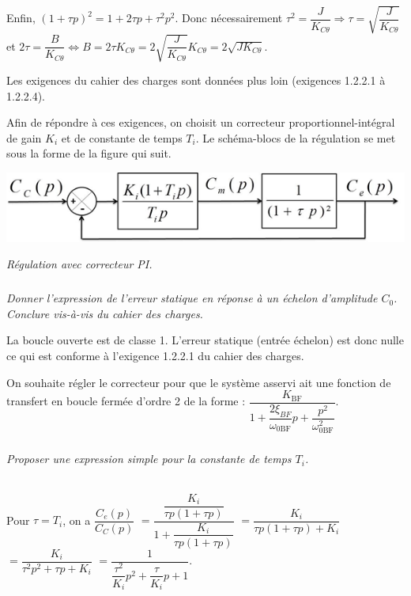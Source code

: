 \documentclass[10pt,fleqn]{article} %
\begin{document}
\begin{multicols}{2}
\begin{corrige}
Enfin, $\left(1+\tau p\right)^2 = 1+2\tau p + \tau^2p^2$. Donc nécessairement $\tau^2=\dfrac{J}{K_{C\theta}} \Rightarrow \tau=\sqrt{\dfrac{J}{K_{C\theta}}}$ et 
$2\tau = \dfrac{B}{K_{C\theta}} \Leftrightarrow B
=2\tau K_{C\theta}
=2\sqrt{\dfrac{J}{K_{C\theta}}} K_{C\theta}
=2\sqrt{JK_{C\theta}}$.
\end{corrige}
\else
\fi


\ifprof
\else
Les exigences du cahier des charges sont données plus loin (exigences 1.2.2.1 à 1.2.2.4).

Afin de répondre à ces exigences, on choisit un correcteur proportionnel-intégral de gain $K_i$ et de constante de temps $T_i$. Le schéma-blocs de la régulation se met sous la forme de la figure qui suit.

\begin{center}
\includegraphics[width=\linewidth]{images/Sujet/images/fig_08}

\textit{Régulation avec correcteur PI.}
\end{center}
\fi

\subparagraph{}
\textit{Donner l’expression de l’erreur statique en réponse à un échelon d'amplitude $C_0$. Conclure vis-à-vis du cahier des charges.}
\ifprof
\begin{corrige}
La boucle ouverte est de classe 1. L'erreur statique (entrée échelon) est donc nulle ce qui est conforme à l'exigence 1.2.2.1 du cahier des charges. 
\end{corrige}
\else
\fi


\ifprof
\else
On souhaite régler le correcteur pour que le système asservi ait une fonction de transfert en boucle fermée
d’ordre 2 de la forme :
$\dfrac{K_{\text{BF}}}{1+\dfrac{2\xi_{BF}}{\omega_{0\text{BF}}}p+\dfrac{p^2}{\omega_{0\text{BF}}^2}}$.
\fi

\subparagraph{}
\textit{Proposer une expression simple pour la constante de temps $T_i$.}
\ifprof
\begin{corrige} ~\\

Pour $\tau=T_i$, on a $\dfrac{C_e(p)}{C_C(p)}$
$=\dfrac{\dfrac{K_i}{\tau p\left(1+\tau p \right)}}{1+\dfrac{K_i}{\tau p\left(1+\tau p \right)}}$
$=\dfrac{K_i}{\tau p\left(1+\tau p \right)+ K_i}$
$=\dfrac{K_i}{\tau^2 p^2+\tau p+ K_i}$
$=\dfrac{1}{\dfrac{\tau^2}{K_i} p^2+\dfrac{\tau}{K_i} p+ 1}$.
\end{corrige}
\else
\fi



\end{multicols}
\end{document}
